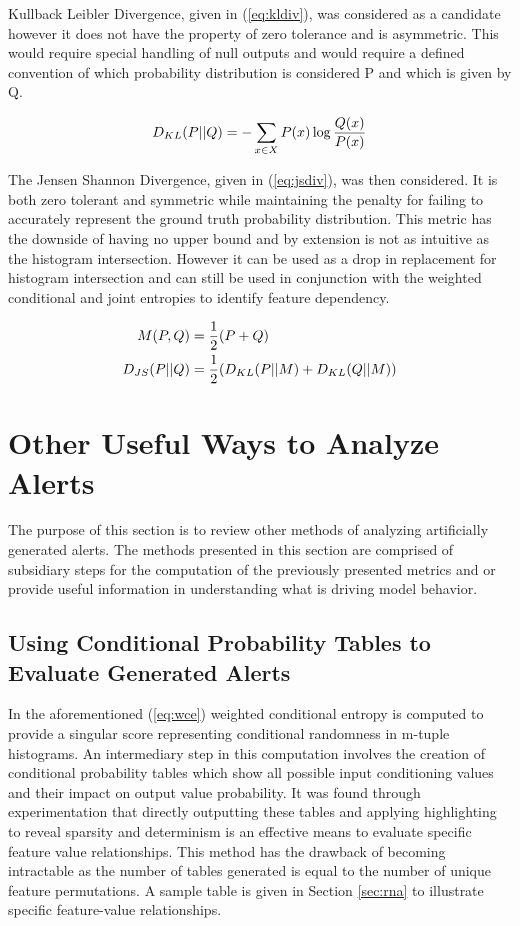 Kullback Leibler Divergence, given in (\ref{eq:kldiv}), was considered as a candidate however it does not have the property of zero tolerance and is asymmetric. This would require special handling of null outputs and would require a defined convention of which probability distribution is considered P and which is given by Q.  

\begin{equation}
	D_{KL}(P||Q) = -\sum_{x \in X}P(x)\log{Q(x) \over P(x)}
\end{equation}

The Jensen Shannon Divergence, given in (\ref{eq:jsdiv}), was then considered. It is both zero tolerant and symmetric while maintaining the penalty for failing to accurately represent the ground truth probability distribution. This metric has the downside of having no upper bound and by extension is not as intuitive as the histogram intersection. However it can be used as a drop in replacement for histogram intersection and can still be used in conjunction with the weighted conditional and joint entropies to identify feature dependency.

\begin{align}
	M(P,Q) &=  {1 \over 2}(P + Q)\label{eq:mid} \\
	D_{JS}(P||Q) &=  {1 \over 2}(D_{KL}(P||M) + D_{KL}(Q||M)) \label{eq:jsdiv}
\end{align}

\section{Other Useful Ways to Analyze Alerts}

The purpose of this section is to review other methods of analyzing artificially generated alerts. The methods presented in this section are comprised of subsidiary steps for the computation of the previously presented metrics and or provide useful information in understanding what is driving model behavior. 

\subsection{Using Conditional Probability Tables to Evaluate Generated Alerts}

In the aforementioned (\ref{eq:wce}) weighted conditional entropy is computed to provide a singular score representing conditional randomness in m-tuple histograms. An intermediary step in this computation involves the creation of conditional probability tables which show all possible input conditioning values and their impact on output value probability. It was found through experimentation that directly outputting these tables and applying highlighting to reveal sparsity and determinism is an effective means to evaluate specific feature value relationships. This method has the drawback of becoming intractable as the number of tables generated is equal to the number of unique feature permutations. A sample table is given in Section \ref{sec:rna} to illustrate specific feature-value relationships.

